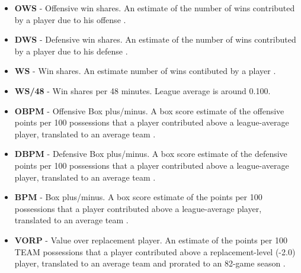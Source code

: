 \documentclass[a4paper]{article}
\begin{document}
\begin{itemize}
	\item \textbf{OWS} - Offensive win shares. An estimate of the number of wins contributed by a player due to his offense \cite{ws}. 
	\item \textbf{DWS} - Defensive win shares. An estimate of the number of wins contributed by a player due to his defense \cite{ws}. 
	\item \textbf{WS} - Win shares. An estimate number of wins contibuted by a player \cite{ws}.
	\item \textbf{WS/48} - Win shares per 48 minutes. League average is around 0.100.
	\item \textbf{OBPM} - Offensive Box plus/minus. A box score estimate of the offensive points per 100 possessions that a player contributed above a league-average player, translated to an average team \cite{bpm}.
	\item \textbf{DBPM} - Defensive Box plus/minus. A box score estimate of the defensive points per 100 possessions that a player contributed above a league-average player, translated to an average team \cite{bpm}.
	\item \textbf{BPM} - Box plus/minus. A box score estimate of the points per 100 possessions that a player contributed above a league-average player, translated to an average team \cite{bpm}.
	\item \textbf{VORP} - Value over replacement player. An estimate of the points per 100 TEAM possessions that a player contributed above a replacement-level (-2.0) player, translated to an average team and prorated to an 82-game season \cite{bpm}.

\end{itemize}


\pagebreak

\appendix


\appendix
\end{document}
